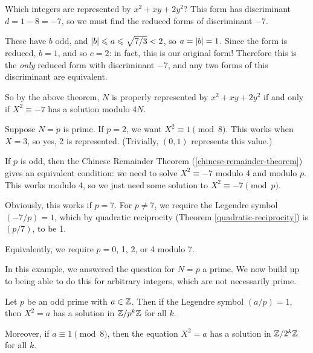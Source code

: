 \documentclass{article}
\begin{document}
\begin{example}[$x^2 + xy + 2y^2$]
    Which integers are represented by $x^2 + xy + 2y^2$? This form has discriminant $d = 1  - 8 = -7$, so we must find the reduced forms of discriminant $-7$.
    
    These have $b$ odd, and $\left\lvert b \right\rvert \leqslant a \leqslant \sqrt{7/3} < 2$, so $a = \left\lvert b \right\rvert = 1$. Since the form is reduced, $b = 1$, and so $c = 2$: in fact, this is our original form! Therefore this is the \textit{only} reduced form with discriminant $-7$, and any two forms of this discriminant are equivalent.
    
    So by the above theorem, $N$ is properly represented by $x^2 + xy + 2y^2$ if and only if $X^2 \equiv -7$ has a solution modulo $4N$.
    
    Suppose $N = p$ is prime. If $p = 2$, we want $X^2 \equiv 1 \pmod{8}$. This works when $X = 3$, so yes, 2 is represented. (Trivially, $(0,1)$ represents this value.)
    
    If $p$ is odd, then the Chinese Remainder Theorem (\ref{chinese-remainder-theorem}) gives an equivalent condition: we need to solve $X^2 \equiv -7$ modulo 4 and modulo $p$. This works modulo 4, so we just need some solution to $X^2 \equiv -7 \pmod{p}$.
    
    Obviously, this works if $p = 7$. For $p \neq 7$, we require the Legendre symbol $(-7/p) = 1$, which by quadratic reciprocity (Theorem \ref{quadratic-reciprocity}) is $(p/7)$, to be 1.
    
    Equivalently, we require $p = 0$, 1, 2, or 4 modulo 7.
\end{example}

\begin{note}
	In this example, we answered the question for $N = p$ a prime. We now build up to being able to do this for arbitrary integers, which are not necessarily prime.
\end{note}

\begin{proposition}
    Let $p$ be an odd prime with $a \in \mathbb{Z}$. Then if the Legendre symbol $(a / p) = 1$, then $X^2 = a$ has a solution in $\mathbb{Z}/p^k\mathbb{Z}$ for all $k$.
    
    Moreover, if $a \equiv 1 \pmod{8}$, then the equation $X^2 = a$ has a solution in $\mathbb{Z}/2^k\mathbb{Z}$ for all $k$.
\end{proposition}
\end{document}
